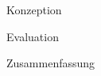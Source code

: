\documentclass[12pt,a4paper,bibliography=totocnumbered,listof=totocnumbered]{scrartcl}
\numberwithin{figure}{section} %
\numberwithin{table}{section} %
\begin{document}
{Konzeption}

\pagebreak

{Evaluation}

\pagebreak

{Zusammenfassung}

\pagebreak
\nolinenumbers
\renewcommand\refname{Quellenverzeichnis}

\printbibliography
\pagebreak
\end{document}
